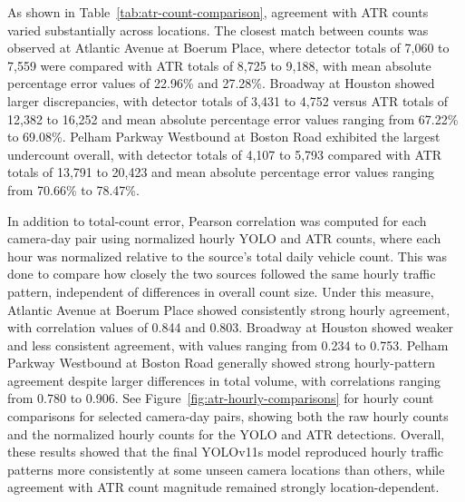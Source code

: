 As shown in Table~\ref{tab:atr-count-comparison}, agreement with ATR counts varied substantially across locations. 
The closest match between counts was observed at Atlantic Avenue at Boerum Place,
where detector totals of 7,060 to 7,559 were compared with ATR totals of 8,725 to 
9,188, with mean absolute percentage error values of 22.96\% and 27.28\%. Broadway
at Houston showed larger discrepancies, with detector totals of 3,431 to 4,752 
versus ATR totals of 12,382 to 16,252 and mean absolute percentage error values 
ranging from 67.22\% to 69.08\%. Pelham Parkway Westbound at Boston Road exhibited 
the largest undercount overall, with detector totals of 4,107 to 5,793 compared
with ATR totals of 13,791 to 20,423 and mean absolute percentage error values 
ranging from 70.66\% to 78.47\%.

In addition to total-count error, Pearson correlation was computed for each camera-day 
pair using normalized hourly YOLO and ATR counts, where each hour was normalized 
relative to the source’s total daily vehicle count. This was done to compare how 
closely the two sources followed the same hourly traffic pattern, independent of 
differences in overall count size. Under this measure, Atlantic Avenue at Boerum 
Place showed consistently strong hourly agreement, with correlation values of 0.844
and 0.803. Broadway at Houston showed weaker and less consistent agreement, with 
values ranging from 0.234 to 0.753. Pelham Parkway Westbound at Boston Road generally 
showed strong hourly-pattern agreement despite larger differences in total volume, 
with correlations ranging from 0.780 to 0.906. See Figure~\ref{fig:atr-hourly-comparisons} for hourly count 
comparisons for selected camera-day pairs, showing both the raw hourly counts and 
the normalized hourly counts for the YOLO and ATR detections.
Overall, these results showed that the final YOLOv11s model reproduced hourly 
traffic patterns more consistently at some unseen camera locations than others, 
while agreement with ATR count magnitude remained strongly location-dependent.

